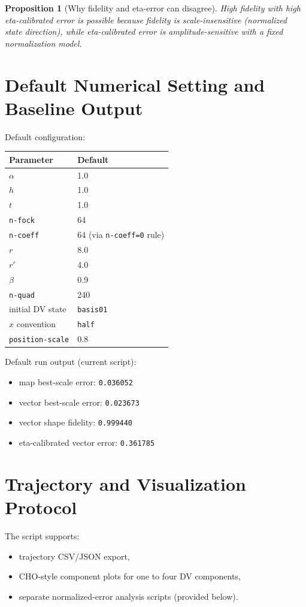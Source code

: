 \documentclass[11pt]{article}
\newtheorem{proposition}{Proposition}
\begin{document}
\begin{proposition}[Why fidelity and eta-error can disagree]
High fidelity with high eta-calibrated error is possible because fidelity is
scale-insensitive (normalized state direction), while eta-calibrated error is
amplitude-sensitive with a fixed normalization model.
\end{proposition}

\section{Default Numerical Setting and Baseline Output}
Default configuration:
\begin{center}
\begin{tabular}{ll}
\toprule
Parameter & Default \\
\midrule
$\alpha$ & 1.0 \\
$h$ & 1.0 \\
$t$ & 1.0 \\
\texttt{n-fock} & 64 \\
\texttt{n-coeff} & 64 (via \texttt{n-coeff=0} rule) \\
$r$ & 8.0 \\
$r'$ & 4.0 \\
$\beta$ & 0.9 \\
\texttt{n-quad} & 240 \\
initial DV state & \texttt{basis01} \\
$\hat{x}$ convention & \texttt{half} \\
\texttt{position-scale} & 0.8 \\
\bottomrule
\end{tabular}
\end{center}

Default run output (current script):
\begin{itemize}[itemsep=2pt]
  \item map best-scale error: \texttt{0.036052}
  \item vector best-scale error: \texttt{0.023673}
  \item vector shape fidelity: \texttt{0.999440}
  \item eta-calibrated vector error: \texttt{0.361785}
\end{itemize}

\section{Trajectory and Visualization Protocol}
The script supports:
\begin{itemize}[itemsep=2pt]
  \item trajectory CSV/JSON export,
  \item CHO-style component plots for one to four DV components,
  \item separate normalized-error analysis scripts (provided below).
\end{itemize}
\end{document}
